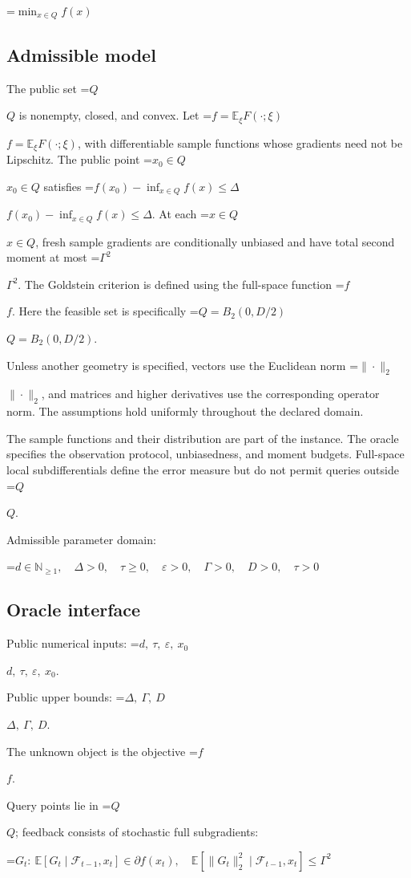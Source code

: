\documentclass[10pt,a4paper]{article}
\newcommand{\AtlasMath}[1]{\par\begingroup\centering\setbox0=\hbox{$\displaystyle #1$}\ifdim\wd0>1.4\linewidth\typeout{ATLAS WIDE FORMULA: \the\wd0}\fi\ifdim\wd0>\linewidth\resizebox{\linewidth}{!}{\box0}\else\box0\fi\par\endgroup}
\newcommand{\AtlasInlineMath}[1]{\begingroup\setbox0=\hbox{$#1$}\ifdim\wd0>.4\linewidth\endgroup\AtlasMath{#1}\else\endgroup$#1$\fi}
\begin{document}
\AtlasMath{\min_{x\in Q}f(x)}


\subsection{Admissible model}
The public set \AtlasInlineMath{Q} is nonempty, closed, and convex. Let \AtlasInlineMath{f=\mathbb E_\xi F(\cdot;\xi)}, with differentiable sample functions whose gradients need not be Lipschitz. The public point \AtlasInlineMath{x_0\in Q} satisfies \AtlasInlineMath{f(x_0)-\inf_{x\in Q}f(x)\le\Delta}. At each \AtlasInlineMath{x\in Q}, fresh sample gradients are conditionally unbiased and have total second moment at most \AtlasInlineMath{\Gamma^2}. The Goldstein criterion is defined using the full-space function \AtlasInlineMath{f}. Here the feasible set is specifically \AtlasInlineMath{Q=B_2(0,D/2)}.

Unless another geometry is specified, vectors use the Euclidean norm \AtlasInlineMath{\|\cdot\|_2}, and matrices and higher derivatives use the corresponding operator norm. The assumptions hold uniformly throughout the declared domain.

The sample functions and their distribution are part of the instance. The oracle specifies the observation protocol, unbiasedness, and moment budgets. Full-space local subdifferentials define the error measure but do not permit queries outside \AtlasInlineMath{Q}.

Admissible parameter domain:


\AtlasMath{d\in\mathbb{N}_{\ge1},\quad \Delta>0,\quad \tau\ge0,\quad \varepsilon>0,\quad \Gamma>0,\quad D>0,\quad \tau>0}


\subsection{Oracle interface}
Public numerical inputs: \AtlasInlineMath{d,\ \tau,\ \varepsilon,\ x_0}.

Public upper bounds: \AtlasInlineMath{\Delta,\ \Gamma,\ D}.

The unknown object is the objective \AtlasInlineMath{f}.

Query points lie in \AtlasInlineMath{Q}; feedback consists of stochastic full subgradients:


\AtlasMath{G_t:\ \mathbb{E}[G_t\mid\mathcal{F}_{t-1},x_t]\in\partial f(x_t),\quad\mathbb{E}[\|G_t\|_2^2\mid\mathcal{F}_{t-1},x_t]\le\Gamma^2}
\end{document}
